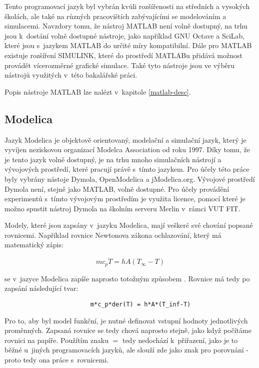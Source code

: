 Tento programovací jazyk byl vybrán kvůli rozšířenosti na středních a vysokých školách, ale také na různých pracovištích zabývajícími se modelováním a simulacemi. Navzdory tomu, že nástroj MATLAB není volně dostupný, na trhu jsou k~dostání volně dostupné nástroje, jako například GNU Octave a SciLab, které jsou s~jazykem MATLAB do určité míry kompatibilní. Dále pro MATLAB existuje rozšíření SIMULINK, které do prostředí MATLABu přidává možnost provádět vícerozměrné grafické simulace. Také tyto nástroje jsou ve výběru nástrojů využitých v~této bakalářské práci.

Popis nástroje MATLAB lze nalézt v~kapitole \ref{matlab-desc}.
\subsection{Modelica}
\label{modelica-lang}
Jazyk Modelica je objektově orientovaný, modelační a simulační jazyk, který je vyvíjen neziskovou organizací Modelca Association od roku 1997. Díky tomu, že je tento jazyk volně dostupný, je na trhu mnoho simulačních nástrojí a vývojových prostředí, které pracují právě s~tímto jazykem. Pro účely této práce byly vybrány nástoje Dymola, OpenModelica a jModelica.org. Vývojové prostředí Dymola není, stejně jako MATLAB, volně dostupné. Pro účely provádění experimentů s~tímto vývojovým prostředím je využita licence, pomocí které je možno spustit nástroj Dymola na školním serveru Merlin v~rámci VUT FIT.

Modely, které jsou zapsány v~jazyku Modelica, mají veškeré své chování popsané rovnicemi. Například rovnice Newtonova zákona ochlazování, který má matematický zápis:

\begin{equation}
    mc_p\Dot{T} = hA(T_{\infty} - T)
\end{equation}

se v~jazyce Modelica zapíše naprosto totožným způsobem \cite{modelica-example}. Rovnice má tedy po zapsání následující tvar:

\begin{verbatim}
                        m*c_p*der(T) = h*A*(T_inf-T)
\end{verbatim}

Pro to, aby byl model funkční, je nutné definovat vstupní hodnoty jednotlivých proměnných. Zapsaná rovnice se tedy chová naprosto stejně, jako když počítáme rovnici na papíře. Použítím znaku $ = $ tedy nedochází k~přiřazení, jako je to běžné u~jiných programovacích jazyků, ale slouží zde jako znak pro porovnání - proto tedy ona práce s~rovnicemi.

